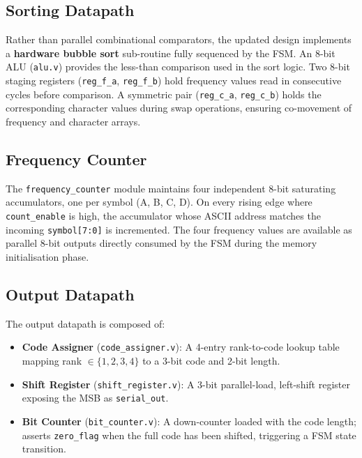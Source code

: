 \documentclass[12pt,a4paper]{article}
\begin{document}
\subsection{Sorting Datapath}
Rather than parallel combinational comparators, the updated design implements a
\textbf{hardware bubble sort} sub-routine fully sequenced by the FSM.
An 8-bit ALU (\texttt{alu.v}) provides the less-than comparison used in the sort logic.
Two 8-bit staging registers (\texttt{reg\_f\_a}, \texttt{reg\_f\_b}) hold frequency
values read in consecutive cycles before comparison. A symmetric pair
(\texttt{reg\_c\_a}, \texttt{reg\_c\_b}) holds the corresponding character values during
swap operations, ensuring co-movement of frequency and character arrays.

\subsection{Frequency Counter}
The \texttt{frequency\_counter} module maintains four independent 8-bit saturating
accumulators, one per symbol (A, B, C, D). On every rising edge where
\texttt{count\_enable} is high, the accumulator whose ASCII address matches the incoming
\texttt{symbol[7:0]} is incremented. The four frequency values are available as parallel
8-bit outputs directly consumed by the FSM during the memory initialisation phase.

\subsection{Output Datapath}
The output datapath is composed of:
\begin{itemize}
  \item \textbf{Code Assigner} (\texttt{code\_assigner.v}): A 4-entry rank-to-code
        lookup table mapping rank $\in \{1,2,3,4\}$ to a 3-bit code and 2-bit length.
  \item \textbf{Shift Register} (\texttt{shift\_register.v}): A 3-bit parallel-load,
        left-shift register exposing the MSB as \texttt{serial\_out}.
  \item \textbf{Bit Counter} (\texttt{bit\_counter.v}): A down-counter loaded with
        the code length; asserts \texttt{zero\_flag} when the full code has been shifted,
        triggering a FSM state transition.
\end{itemize}
\end{document}
